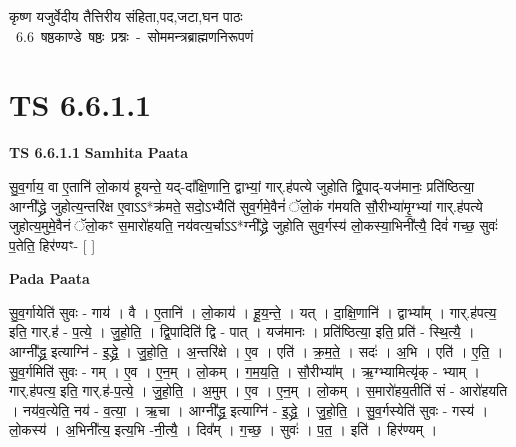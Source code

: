 \documentclass[17pt]{extarticle}
\begin{document}
\begin{titlepage}
    \begin{center}
 
\begin{sanskrit}
    { \Large
    कृष्ण यजुर्वेदीय तैत्तिरीय संहिता,पद,जटा,घन पाठः 
    }
    \\
    \vspace{2.5cm}
    \mbox{ \Large
    6.6       षष्ठकाण्डे षष्ठः प्रश्नः - सोममन्त्रब्राह्मणनिरूपणं   }
\end{sanskrit}
\end{center}

\end{titlepage}
\tableofcontents
{}
\pagebreak


\section{ TS 6.6.1.1 }

\textbf{TS 6.6.1.1 } \newline
\textbf{Samhita Paata} \newline

सु॒व॒र्गाय॒ वा ए॒तानि॑ लो॒काय॑ हूयन्ते॒ यद्-दा᳚क्षि॒णानि॒ द्वाभ्यां॒ गार्.ह॑पत्ये जुहोति द्वि॒पाद्-यज॑मानः॒ प्रति॑ष्ठित्या॒ आग्नी᳚द्ध्रे जुहोत्य॒न्तरि॑क्ष ए॒वाऽऽ*क्र॑मते॒ सदो॒ऽभ्यैति॑ सुव॒र्गमे॒वैनं॑ ॅलो॒कं ग॑मयति सौ॒रीभ्या॑मृ॒ग्भ्यां गार्.ह॑पत्ये जुहोत्य॒मुमे॒वैनं ॅलो॒कꣳ स॒मारो॑हयति॒ नय॑वत्य॒र्चाऽऽ*ग्नी᳚द्ध्रे जुहोति सुव॒र्गस्य॑ लो॒कस्या॒भिनी᳚त्यै॒ दिवं॑ गच्छ॒ सुवः॑ प॒तेति॒ हिर॑ण्यꣳ- [  ] \newline

\textbf{Pada Paata} \newline

सु॒व॒र्गायेति॑ सुवः - गाय॑ । वै । ए॒तानि॑ । लो॒काय॑ । हू॒य॒न्ते॒ । यत् । दा॒क्षि॒णानि॑ । द्वाभ्या᳚म् । गार्.ह॑पत्य॒ इति॒ गार्.ह॑ - प॒त्ये॒ । जु॒हो॒ति॒ । द्वि॒पादिति॑ द्वि - पात् । यज॑मानः । प्रति॑ष्ठित्या॒ इति॒ प्रति॑ - स्थि॒त्यै॒ । आग्नी᳚द्ध्र॒ इत्याग्नि॑ - इ॒द्ध्रे॒ । जु॒हो॒ति॒ । अ॒न्तरि॑क्षे । ए॒व । एति॑ । क्र॒म॒ते॒ । सदः॑ । अ॒भि । एति॑ । ए॒ति॒ । सु॒व॒र्गमिति॑ सुवः - गम् । ए॒व । ए॒न॒म् । लो॒कम् । ग॒म॒य॒ति॒ । सौ॒रीभ्या᳚म् । ऋ॒ग्भ्यामित्यृ॑क् - भ्याम् । गार्.ह॑पत्य॒ इति॒ गार्.ह॑-प॒त्ये॒ । जु॒हो॒ति॒ । अ॒मुम् । ए॒व । ए॒न॒म् । लो॒कम् । स॒मारो॑हय॒तीति॑ सं - आरो॑हयति । नय॑व॒त्येति॒ नय॑ - व॒त्या॒ । ऋ॒चा । आग्नी᳚द्ध्र॒ इत्याग्नि॑ - इ॒द्ध्रे॒ । जु॒हो॒ति॒ । सु॒व॒र्गस्येति॑ सुवः - गस्य॑ । लो॒कस्य॑ । अ॒भिनी᳚त्य॒ इत्य॒भि -नी॒त्यै॒ । दिव᳚म् । ग॒च्छ॒ । सुवः॑ । प॒त॒ । इति॑ । हिर॑ण्यम् ।  \newline
\end{document}
